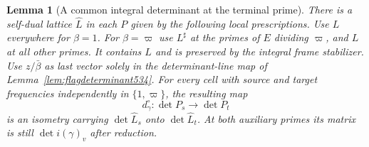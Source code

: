 \documentclass[a4paper,11pt]{article}
\newtheorem{lemma}[proposition]{Lemma}
\theoremstyle{definition}
\theoremstyle{remark}
\numberwithin{equation}{section}
\begin{document}
\begin{lemma}[A common integral determinant at the terminal prime]
\leavevmode\label{lem:completedcolumn535}
There is a self-dual lattice \(\widehat L\) in each \(P\) given
by the following local prescriptions. Use \(L\) everywhere for
\(\beta=1\). For \(\beta=\varpi\) use \(L^\sharp\) at the primes
of \(E\) dividing \(\varpi\), and \(L\) at all other primes.
It contains \(L\) and is preserved by the integral frame
stabilizer. Use \(z/\bar\beta\) as last vector solely in the
determinant-line map of Lemma~\ref{lem:flagdeterminant534}.
For every cell with source and target frequencies independently
in \(\{1,\varpi\}\), the resulting map
\[
      d_\gamma^\circ:\det P_s\longrightarrow\det P_t
\]
is an isometry carrying \(\det\widehat L_s\) onto
\(\det\widehat L_t\). At both auxiliary primes its matrix
is still \(\det i(\gamma)_v\) after reduction.
\end{lemma}
\end{document}
